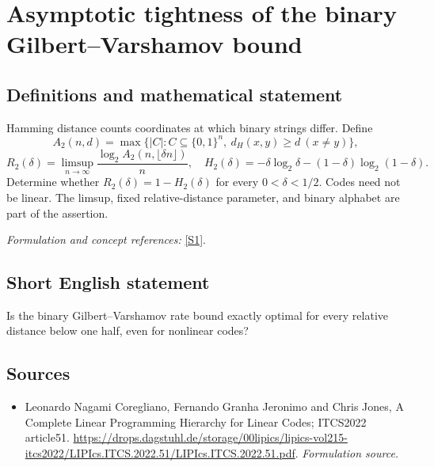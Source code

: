 \documentclass[11pt]{article}
\begin{document}
\section*{\texorpdfstring{Asymptotic tightness of the binary Gilbert–Varshamov bound}{Asymptotic tightness of the binary Gilbert–Varshamov bound}}\label{30006751}
\subsection{Definitions and mathematical statement}
Hamming distance counts coordinates at which binary strings differ. Define
\[
 A_2(n,d)=\max\{|C|:C\subseteq\{0,1\}^n,\ d_H(x,y)\ge d\ (x\ne y)\},
\]
\[
 R_2(\delta)=\limsup_{n\to\infty}\frac{\log_2A_2(n,\lfloor\delta n\rfloor)}n,
 \quad H_2(\delta)=-\delta\log_2\delta-(1-\delta)\log_2(1-\delta).
\]
Determine whether $R_2(\delta)=1-H_2(\delta)$ for every $0<\delta<1/2$. Codes need not be linear. The limsup, fixed relative-distance parameter, and binary alphabet are part of the assertion.
\par\smallskip\textit{Formulation and concept references:} \href{https://drops.dagstuhl.de/storage/00lipics/lipics-vol215-itcs2022/LIPIcs.ITCS.2022.51/LIPIcs.ITCS.2022.51.pdf}{[S1]}.

\subsection{Short English statement}
Is the binary Gilbert--Varshamov rate bound exactly optimal for every relative distance below one half, even for nonlinear codes?
\subsection{Sources}
\begin{itemize}
\item[S1]Leonardo Nagami Coregliano, Fernando Granha Jeronimo and Chris Jones, A Complete Linear Programming Hierarchy for Linear Codes; ITCS2022 article51.
\url{https://drops.dagstuhl.de/storage/00lipics/lipics-vol215-itcs2022/LIPIcs.ITCS.2022.51/LIPIcs.ITCS.2022.51.pdf}.
\textit{Formulation source.}
\end{itemize}
\end{document}

